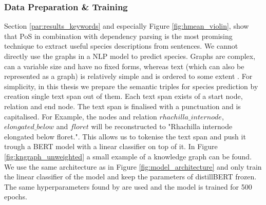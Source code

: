 \documentclass[a4paper, 12pt, oneside]{book} %
\begin{document}
\subsubsection{Data Preparation \& Training} \label{par:pos_training}
Section \ref{par:results_keywords} and especially Figure \ref{fig:hmean_violin}, show that PoS in combination with dependency parsing is the most promising technique to extract useful species descriptions from sentences.
We cannot directly use the graphs in a NLP model to predict species.
Graphs are complex, can a variable size and have no fixed forms, whereas text (which can also be represented as a graph) is relatively simple and is ordered to some extent \autocite{sanchez-lengeling_gentle_2021}. 
For simplicity, in this thesis we prepare the semantic triples for species prediction by creation single text span out of them.
Each text span exists of a start node, relation and end node.
The text span is finalised with a punctuation and is capitalised.
For Example, the nodes and relation $rhachilla\_internode$, $elongated\_below$ and $floret$ will be reconstructed to "Rhachilla internode elongated below floret.".
This allows us to tokenise the text span and push it trough a BERT model with a linear classifier on top of it.
In Figure \ref{fig:kngraph_unweighted} a small example of a knowledge graph can be found.
We use the same architecture as in Figure \ref{fig:model_architecture} and only train the linear classifier of the model and keep the parameters of distillBERT frozen.
The same hyperparameters found by \textcite{sun_how_2020} are used and the model is trained for 500 epochs.
\end{document}
